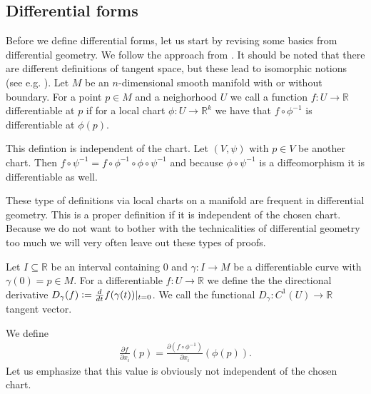 \documentclass[12pt,a4paper]{article}
\numberwithin{equation}{subsection}
\numberwithin{lemma}{subsection}
\theoremstyle{definition}
\newcommand{\real}{\mathbb{R}}
\begin{document}
\subsection{Differential forms}

Before we define differential forms, let us start by revising some basics
from differential geometry. We follow the approach from 
\cite[Sec. II.5]{topology_and_geometry}. 
It should be noted that there are different definitions of tangent space, but
these lead to isomorphic notions 
(see e.g. \cite[Sec.\,1.B]{riemannian_geometry}).
Let $M$ be an $n$-dimensional smooth manifold with or without boundary.
For a point $p \in M$ and a neighorhood $U$ we call a function 
$f: U \rightarrow \real$ differentiable at $p$ if for a local chart 
$\phi: U \rightarrow \real^k$ we have that $f \circ \phi^{-1}$ is differentiable
at $\phi(p)$.

This defintion is independent of the chart. Let $(V,\psi)$ with $p \in V$ be 
another chart. 
Then $f\circ \psi^{-1} = f \circ \phi^{-1} \circ \phi \circ \psi^{-1}$ and 
because $\phi \circ \psi^{-1}$ is a diffeomorphism it is differentiable as well.

These type of definitions via local charts on a manifold are frequent in
differential geometry. This is a proper definition if it is independent of the 
chosen chart. Because we do not want to bother with the technicalities of 
differential geometry too much we will very often leave out these types of
proofs.  

Let $I \subseteq \real$ be an interval containing $0$ and 
$\gamma: I \rightarrow M$ be a differentiable curve with $\gamma(0) = p \in M$.
For a differentiable $f: U \rightarrow \real$ 
we define the the directional derivative 
$D_\gamma(f) \vcentcolon= \frac{d}{dt} f(\gamma(t)) |_{t=0}$.
We call the functional $D_\gamma: C^1(U) \rightarrow \real$ 
tangent vector. 

We define 
\begin{align}
    \frac{\partial f}{\partial x_i} (p) 
    = \frac{\partial (f \circ \phi^{-1})}{\partial x_i}(\phi(p)).
    \label{eq:derivative_on_manifold}
\end{align}
Let us emphasize that this value is obviously not independent of the chosen 
chart.
\end{document}
